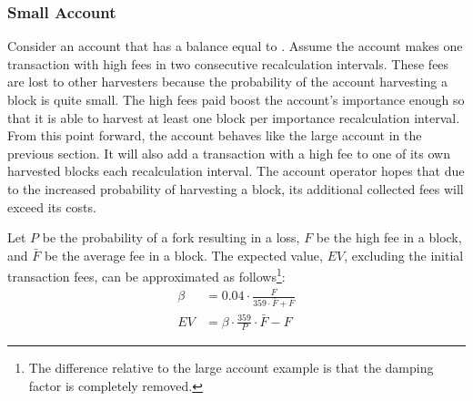\subsubsection*{Small Account}

Consider an account that has a balance equal to .
Assume the account makes one transaction with high fees in two consecutive recalculation intervals.
These fees are lost to other harvesters because the probability of the account harvesting a block is quite small.
The high fees paid boost the account’s importance enough so that it is able to harvest at least one block per importance recalculation interval.
From this point forward, the account behaves like the large account in the previous section.
It will also add a transaction with a high fee to one of its own harvested blocks each recalculation interval.
The account operator hopes that due to the increased probability of harvesting a block, its additional collected fees will exceed its costs.

\begin{figure}[H]
\end{figure}

Let $P$ be the probability of a fork resulting in a loss, $F$ be the high fee in a block, and $\bar{F}$ be the average fee in a block.
The expected value, $EV$, excluding the initial transaction fees, can be approximated as follows\footnote{
The difference relative to the large account example is that the damping factor is completely removed.}:
\begin{align*}
	\tag{importance boost}\beta &= 0.04 \cdot \frac{F}{359 \cdot \bar{F} + F} \\
	\tag{expected value} EV &= \beta \cdot \frac{359}{P} \cdot \bar{F} - F
\end{align*}

